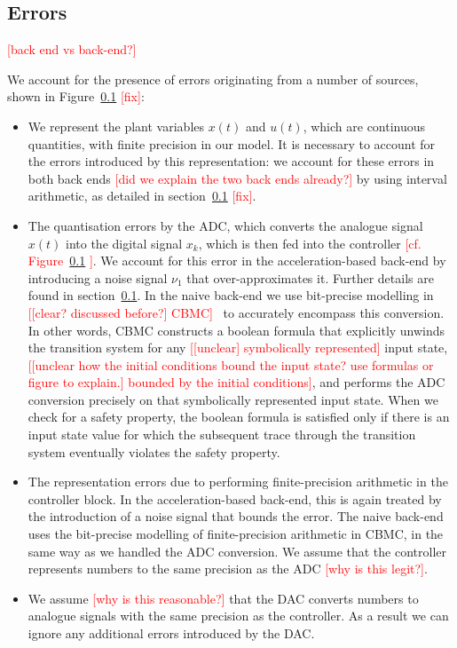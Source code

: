 \documentclass[twocolumn]{autart}    %
\renewcommand{\note}[1]{\textcolor{red}{[#1]}}
\begin{document}
\subsection{Errors}

\note{back end vs back-end?} 

We account for the presence of errors originating from a number of sources, shown in Figure~\ref{} \note{fix}:
\begin{itemize}
\item We represent the plant variables $x(t)$ and $u(t)$, which are continuous quantities, with finite precision in our model. 
It is necessary to account for the errors introduced by this representation: 
we account for these errors in both back ends \note{did we explain the two back ends already?} by using interval arithmetic, as detailed in section~\ref{} \note{fix}. 
\item The quantisation errors by the ADC, which converts the analogue signal $x(t)$ into the digital signal $x_k$, 
which is then fed into the controller \note{cf. Figure~\ref{} }. 
We account for this error in the acceleration-based back-end by introducing a noise signal $\nu_1$ that over-approximates it. Further details are found in section~\ref{}.  
In the naive back-end we use bit-precise modelling in \note{[clear? discussed before?] CBMC}~\cite{} to accurately encompass this conversion.   
In other words, CBMC constructs a boolean formula that explicitly unwinds the transition system for any \note{[unclear] symbolically represented} input state, 
\note{[unclear how the initial conditions bound the input state? use formulas or figure to explain.] bounded by the initial conditions}, 
and performs the ADC conversion precisely on that symbolically represented input state. 
When we check for a safety property, 
the boolean formula is satisfied only if there is an input state value for which the subsequent trace through the transition system eventually violates the safety property.  
\item The representation errors due to performing finite-precision arithmetic in the controller block. 
In the acceleration-based back-end, 
this is again treated by the introduction of a noise signal that bounds the error. 
The naive back-end uses the bit-precise modelling of finite-precision arithmetic in CBMC, 
in the same way as we handled the ADC conversion. 
We assume that the controller represents numbers to the same precision as the ADC \note{why is this legit?}. 
\item We assume \note{why is this reasonable?} that the DAC converts numbers to analogue signals with the same precision as the controller. 
As a result we can ignore any additional errors introduced by the DAC.  
\end{itemize}
\end{document}
